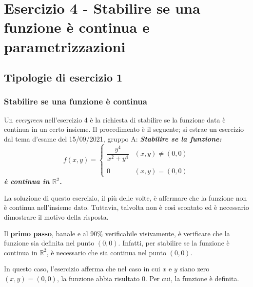 \documentclass[a4paper]{article}
\begin{document}
	
	\newpage

	\section{Esercizio 4 - Stabilire se una funzione è continua e parametrizzazioni}

	\subsection{Tipologie di esercizio 1}

	\subsubsection{Stabilire se una funzione è continua}

	Un \emph{evergreen} nell'esercizio 4 è la richiesta di stabilire se la funzione data è continua in un certo insieme. Il procedimento è il seguente; si estrae un esercizio dal tema d'esame del 15/09/2021, gruppo A: \textcolor{Green4}{\textbf{\emph{Stabilire se la funzione:}}
	\begin{equation*}
		f\left(x,y\right) = \begin{cases}
			\dfrac{y^{4}}{x^{2} + y^{4}} & \left(x,y\right) \ne \left(0,0\right) \\
			\\
			0	& \left(x,y\right) = \left(0,0\right)
		\end{cases}
	\end{equation*}
	\textbf{\emph{è continua in $\mathbb{R}^{2}$.}}}\newline

	\noindent
	La soluzione di questo esercizio, il più delle volte, è affermare che la funzione non è continua nell'insieme dato. Tuttavia, talvolta non è così scontato ed è necessario dimostrare il motivo della risposta.\newline
	
	\noindent
	Il \textbf{primo passo}, banale e al 90\% verificabile visivamente, è verificare che la funzione sia definita nel punto $\left(0,0\right)$. Infatti, per stabilire se la funzione è continua in $\mathbb{R}^{2}$, è \underline{necessario} che sia continua nel punto $\left(0,0\right)$.

	In questo caso, l'esercizio afferma che nel caso in cui $x$ e $y$ siano zero $\left(x,y\right) = \left(0,0\right)$, la funzione abbia risultato $0$. Per cui, la funzione è definita.\newline
\end{document}
